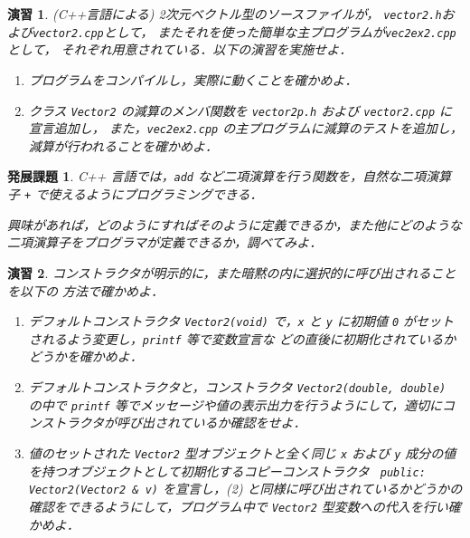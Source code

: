 \documentclass[11pt,a4,epsf]{jarticle}
\newtheorem{exerc}{演習}
\newtheorem{adv}{発展課題}
\begin{document}
\begin{exerc} %
(C++言語による) 2次元ベクトル型のソースファイルが，
\verb+vector2.h+および\verb+vector2.cpp+として，
またそれを使った簡単な主プログラムが\verb+vec2ex2.cpp+として，
それぞれ用意されている．以下の演習を実施せよ．

\begin{enumerate}

\item[(1)] プログラムをコンパイルし，実際に動くことを確かめよ．

\item[(2)] クラス \verb+Vector2+ の減算のメンバ関数を
\verb+vector2p.h+ および \verb+vector2.cpp+ に宣言追加し，
また，\verb+vec2ex2.cpp+ の主プログラムに減算のテストを追加し，
減算が行われることを確かめよ．


\end{enumerate}
\end{exerc} %

\begin{adv}
C++ 言語では，\verb+add+ など二項演算を行う関数を，自然な二項演算子 \verb=+= で使えるようにプログラミングできる．

興味があれば，どのようにすればそのように定義できるか，また他にどのような二項演算子をプログラマが定義できるか，調べてみよ．
\end{adv}

\begin{exerc} %
コンストラクタが明示的に，また暗黙の内に選択的に呼び出されることを以下の
方法で確かめよ．
\begin{enumerate}
\item[(1)] 
デフォルトコンストラクタ \verb+Vector2(void)+ で，\verb+x+ と \verb+y+
に初期値 \verb+0+ がセットされるよう変更し，\verb+printf+ 等で変数宣言な
	   どの直後に初期化されているかどうかを確かめよ．
\item[(2)] 
デフォルトコンストラクタと，コンストラクタ
\verb+Vector2(double, double)+ の中で \verb+printf+ 等でメッセージや値の表示出力を行うようにして，適切にコンストラクタが呼び出されているか確認をせよ．
\item[(3)]
値のセットされた \verb+Vector2+ 型オブジェクトと全く同じ \verb+x+ および
\verb+y+ 成分の値を持つオブジェクトとして初期化するコピーコンストラクタ 
\verb/ public: Vector2(Vector2 & v)/ 
を宣言し，(2) と同様に呼び出されているかどうかの確認をできるようにして，プログラム中で
\verb+Vector2+ 型変数への代入を行い確かめよ．
\end{enumerate}

\end{exerc} %
\end{document}
